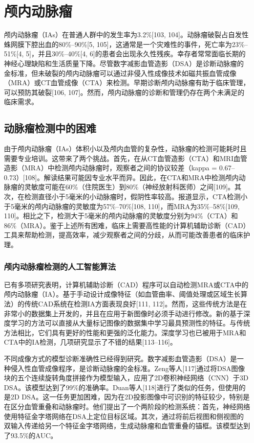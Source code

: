 \documentclass[11pt]{article}
\begin{document}
\section{\kaishu 颅内动脉瘤}

颅内动脉瘤（IAs）在普通人群中的发生率为3.2\%[103, 104]。动脉瘤破裂占自发性蛛网膜下腔出血的80\%–90\%[5, 105]，这通常是一个灾难性的事件，死亡率为23\%–51\%[4, 5]，并且30\%–40\%[4, 6]的患者会出现永久性残疾。幸存者常常面临长期的神经心理缺陷和生活质量下降。尽管数字减影血管造影（DSA）是诊断动脉瘤的金标准，但未破裂的颅内动脉瘤可以通过非侵入性成像技术如磁共振血管成像（MRA）或CT血管成像（CTA）来检测。早期诊断颅内动脉瘤有助于临床管理，可以预防其破裂[106, 107]。然而，颅内动脉瘤的诊断和管理仍存在两个未满足的临床需求。

\subsection{\kaishu 动脉瘤检测中的困难}

由于颅内动脉瘤（IAs）体积小以及颅内血管的复杂性，动脉瘤的检测可能耗时且需要专业培训。这带来了两个挑战。首先，在从CT血管造影（CTA）和MRI血管造影（MRA）中检测颅内动脉瘤时，观察者之间的协议较差（kappa = 0.67–0.73）[108]。解读结果可能因专业水平而异。因此，在CTA和MRA中检测颅内动脉瘤的灵敏度可能在60\%（住院医生）到80\%（神经放射科医师）之间[109]。其次，在检测直径小于5毫米的小动脉瘤时，假阴性率较高。报道显示，CTA检测小于5毫米的颅内动脉瘤的灵敏度为57\%–70\%[108, 110]，而MRA为35\%–58\%[109, 110]。相比之下，检测大于5毫米的颅内动脉瘤的灵敏度分别为94\%（CTA）和86\%（MRA）。鉴于上述所有困难，临床上需要高性能的计算机辅助诊断（CAD）工具来帮助检测，提高效率，减少观察者之间的分歧，从而可能改善患者的临床护理。

\subsubsection{\kaishu 颅内动脉瘤检测的人工智能算法}

已有多项研究表明，计算机辅助诊断（CAD）程序可以自动检测MRA或CTA中的颅内动脉瘤（IA）。基于手动设计成像特征（如血管曲率、阈值处理或区域生长算法）的传统CAD系统在检测IA方面表现良好[111, 112]。然而，这些传统方法是在非常小的数据集上开发的，并且在应用于新图像时必须手动进行修改。新的基于深度学习的方法可以直接从大量标记图像的数据集中学习最具预测性的特征。与传统方法相比，它们具有更好的性能和更强的泛化能力。深度学习也已被用于MRA和CTA中的IA检测，几项研究显示了不错的结果[113–116]。

不同成像方式的模型诊断准确性已经得到研究。数字减影血管造影（DSA）是一种侵入性血管成像程序，是诊断动脉瘤的金标准。Zeng等人[117]通过将DSA图像块的五个连续旋转角度拼接作为模型输入，应用了2D卷积神经网络（CNN）于3D DSA。该模型达到了99\%的准确率。Duan等人[118]进行了类似的任务，但使用的是2D DSA。这一任务更加困难，因为在2D投影图像中可识别的特征较少，特别是在区分血管重叠和动脉瘤时。他们提出了一个两阶段的检测系统：首先，神经网络使用特征金字塔网络在DSA上定位目标区域。其次，通过将前后视图和侧视图的双输入传递给另一个特征金字塔网络，生成动脉瘤和血管重叠的锚框。该模型达到了93.5\%的AUC。
\end{document}
